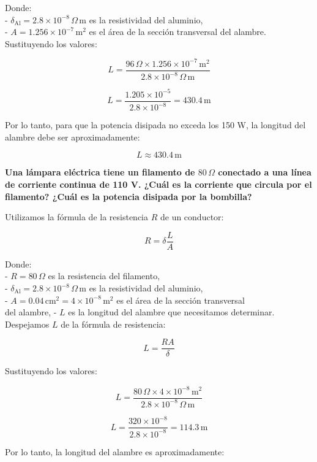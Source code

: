 \documentclass[answers]{exam} %
\begin{document}
\begin{questions}
	Donde:\\
	- \(\delta_{\text{Al}} = 2.8 \times 10^{-8} \, \Omega \, \text{m}\) es la resistividad del aluminio,\\
	- \(A = 1.256 \times 10^{-7} \, \text{m}^2\) es el área de la sección transversal del alambre.\\

	Sustituyendo los valores:

	\[
		L = \frac{96 \, \Omega \times 1.256 \times 10^{-7} \, \text{m}^2}{2.8 \times 10^{-8} \, \Omega \, \text{m}}
	\]

	\[
		L = \frac{1.205 \times 10^{-5}}{2.8 \times 10^{-8}} = 430.4 \, \text{m}
	\]

	Por lo tanto, para que la potencia disipada no exceda los 150 W, la longitud del alambre debe ser aproximadamente:

	\[
		L \approx 430.4 \, \text{m}
	\]


	\question \textbf{Una lámpara eléctrica tiene un filamento de \(80 \, \Omega\) conectado a una línea de corriente continua de 110 V. ¿Cuál es la corriente que circula por el filamento? ¿Cuál es la potencia disipada por la bombilla?}


	Utilizamos la fórmula de la resistencia \(R\) de un conductor:

	\[
		R = \delta \frac{L}{A}
	\]

	Donde:\\
	- \(R = 80 \, \Omega\) es la resistencia del filamento,\\
	- \(\delta_{\text{Al}} = 2.8 \times 10^{-8} \, \Omega \, \text{m}\) es la resistividad del aluminio,\\
	- \(A = 0.04 \, \text{cm}^2 = 4 \times 10^{-8} \, \text{m}^2\) es el área de la sección transversal \\del alambre,
	- \(L\) es la longitud del alambre que necesitamos determinar.\\

	Despejamos \(L\) de la fórmula de resistencia:

	\[
		L = \frac{R A}{\delta}
	\]

	Sustituyendo los valores:

	\[
		L = \frac{80 \, \Omega \times 4 \times 10^{-8} \, \text{m}^2}{2.8 \times 10^{-8} \, \Omega \, \text{m}}
	\]

	\[
		L = \frac{320 \times 10^{-8}}{2.8 \times 10^{-8}} = 114.3 \, \text{m}
	\]

	Por lo tanto, la longitud del alambre es aproximadamente:


\end{questions}
\end{document}
